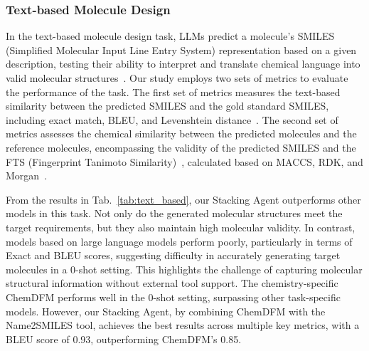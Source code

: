 \subsubsection{Text-based Molecule Design}
In the text-based molecule design task, LLMs predict a molecule’s SMILES (Simplified Molecular Input Line Entry System) representation based on a given description, testing their ability to interpret and translate chemical language into valid molecular structures~\cite{zhao2024chemdfmlargelanguagefoundation}.
Our study employs two sets of metrics to evaluate the performance of the task. The first set of metrics measures the text-based similarity between the predicted SMILES and the gold standard SMILES, including exact match, BLEU, and Levenshtein distance~\cite{haldar2011levenshteindistancetechniquedictionary}. 
The second set of metrics assesses the chemical similarity between the predicted molecules and the reference molecules, encompassing the validity of the predicted SMILES and the FTS (Fingerprint Tanimoto Similarity)~\cite{tanimoto1958elementary}, calculated based on MACCS, RDK, and Morgan~\cite{Morgan1965TheGO}.

From the results in Tab.~\ref{tab:text_based}, our Stacking Agent outperforms other models in this task. Not only do the generated molecular structures meet the target requirements, but they also maintain high molecular validity. In contrast, models based on large language models perform poorly, particularly in terms of Exact and BLEU scores, suggesting difficulty in accurately generating target molecules in a 0-shot setting. This highlights the challenge of capturing molecular structural information without external tool support. The chemistry-specific ChemDFM performs well in the 0-shot setting, surpassing other task-specific models. However, our Stacking Agent, by combining ChemDFM with the Name2SMILES tool, achieves the best results across multiple key metrics, with a BLEU score of 0.93, outperforming ChemDFM’s 0.85.

